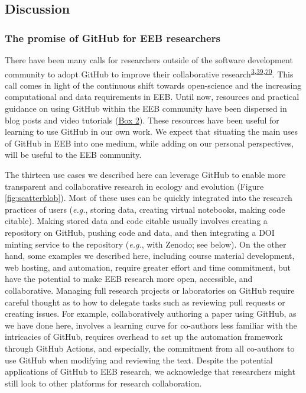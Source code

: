 \hypertarget{discussion}{%
\subsection{Discussion}\label{discussion}}

\hypertarget{the-promise-of-github-for-eeb-researchers}{%
\subsubsection{The promise of GitHub for EEB researchers}\label{the-promise-of-github-for-eeb-researchers}}

There have been many calls for researchers outside of the software development community to adopt GitHub to improve their collaborative research\textsuperscript{\protect\hyperlink{ref-10ghgV3S8}{3},\protect\hyperlink{ref-1Du6fzB8g}{39},\protect\hyperlink{ref-UsTxAq4f}{70}}.
This call comes in light of the continuous shift towards open-science and the increasing computational and data requirements in EEB.
Until now, resources and practical guidance on using GitHub within the EEB community have been dispersed in blog posts and video tutorials (\protect\hyperlink{tips}{Box 2}).
These resources have been useful for learning to use GitHub in our own work.
We expect that situating the main uses of GitHub in EEB into one medium, while adding on our personal perspectives, will be useful to the EEB community.

The thirteen use cases we described here can leverage GitHub to enable more transparent and collaborative research in ecology and evolution (Figure \ref{fig:scatterblob}).
Most of these uses can be quickly integrated into the research practices of users (\emph{e.g.}, storing data, creating virtual notebooks, making code citable).
Making stored data and code citable usually involves creating a repository on GitHub, pushing code and data, and then integrating a DOI minting service to the repository (\emph{e.g.}, with Zenodo; see below).
On the other hand, some examples we described here, including course material development, web hosting, and automation, require greater effort and time commitment, but have the potential to make EEB research more open, accessible, and collaborative.
Managing full research projects or laboratories on GitHub require careful thought as to how to delegate tasks such as reviewing pull requests or creating issues.
For example, collaboratively authoring a paper using GitHub, as we have done here, involves a learning curve for co-authors less familiar with the intricacies of GitHub, requires overhead to set up the automation framework through GitHub Actions, and especially, the commitment from all co-authors to use GitHub when modifying and reviewing the text.
Despite the potential applications of GitHub to EEB research, we acknowledge that researchers might still look to other platforms for research collaboration.

